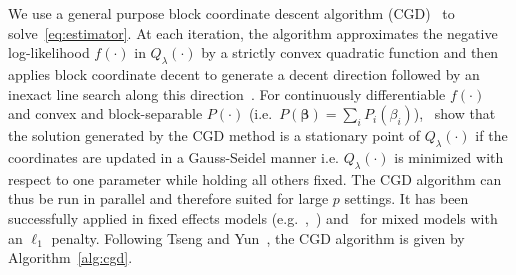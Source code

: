 \documentclass[12pt,letter]{article}\usepackage[]{graphicx}\usepackage[]{color}
\newcommand{\bbeta}{\boldsymbol{\beta}}
\begin{document}
We use a general purpose block coordinate descent algorithm (CGD)~\citep{tseng2009coordinate} to solve~\eqref{eq:estimator}. At each iteration, the algorithm approximates the negative log-likelihood $f(\cdot)$ in $Q_{\lambda}(\cdot)$ by a strictly convex quadratic function and then applies block coordinate decent to generate a decent direction followed by an inexact line search along this direction~\citep{tseng2009coordinate}. For continuously differentiable $f(\cdot)$ and convex and block-separable $P(\cdot)$ \mbox{(i.e. $P(\bbeta) = \sum_i P_i (\beta_i)$)},~\cite{tseng2009coordinate} show that the solution generated by the CGD method is a stationary point of $Q_{\lambda}(\cdot)$ if the coordinates are updated in a Gauss-Seidel manner i.e. $Q_{\lambda}(\cdot)$ is minimized with respect to one parameter while holding all others fixed. The CGD algorithm can thus be run in parallel and therefore suited for large $p$ settings. It has been successfully applied in fixed effects models (e.g.~\cite{meier2008group},~\cite{friedman2010regularization}) and~\cite{schelldorfer2011estimation} for mixed models with an $\ell_1$ penalty. Following Tseng and Yun~\cite{tseng2009coordinate}, the CGD algorithm is given by Algorithm~\ref{alg:cgd}.
\end{document}
